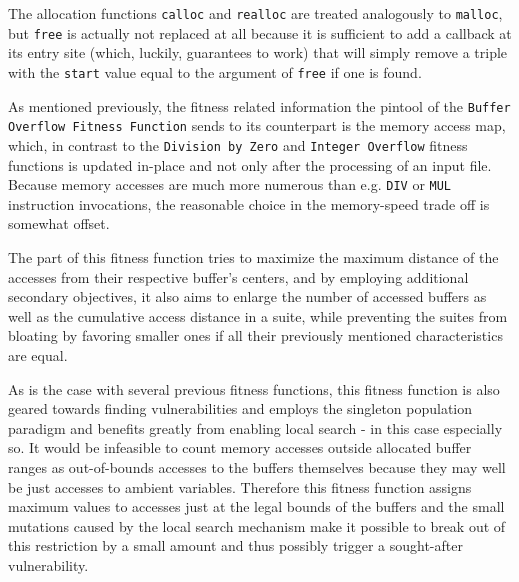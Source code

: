 The allocation functions \texttt{calloc} and \texttt{realloc} are treated analogously to \texttt{malloc}, but
\texttt{free} is actually not replaced at all because it is sufficient to add a callback at its entry site
(which, luckily, \pin guarantees to work) that will simply remove a triple with the \texttt{start} value equal
to the argument of \texttt{free} if one is found.

As mentioned previously, the fitness related information the pintool of the \texttt{Buffer Overflow Fitness
Function} sends to its \java counterpart is the memory access map, which, in contrast to the \texttt{Division
by Zero} and \texttt{Integer Overflow} fitness functions is updated in-place and not only after the processing
of an input file. Because memory accesses are much more numerous than e.g. \texttt{DIV} or \texttt{MUL}
instruction invocations, the reasonable choice in the memory-speed trade off is somewhat offset.

The \java part of this fitness function tries to maximize the maximum distance of the accesses from their
respective buffer's centers, and by employing additional secondary objectives, it also aims to enlarge the
number of accessed buffers as well as the cumulative access distance in a suite, while preventing the suites
from bloating by favoring smaller ones if all their previously mentioned characteristics are equal.

As is the case with several previous fitness functions, this fitness function is also geared towards finding
vulnerabilities and employs the singleton population paradigm and benefits greatly from enabling local search -
in this case especially so. It would be infeasible to count memory accesses outside allocated buffer ranges as
out-of-bounds accesses to the buffers themselves because they may well be just accesses to ambient variables.
Therefore this fitness function assigns maximum values to accesses just at the legal bounds of the buffers and
the small mutations caused by the local search mechanism make it possible to break out of this restriction
by a small amount and thus possibly trigger a sought-after vulnerability.
